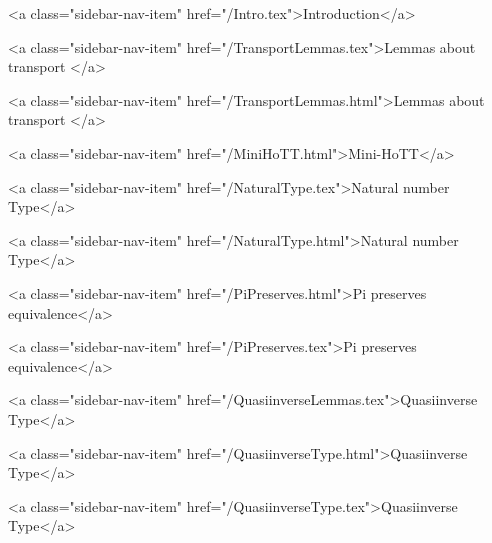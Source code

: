       
    
      
        
          <a class="sidebar-nav-item" href="/Intro.tex">Introduction</a>
        
      
    
      
        
          <a class="sidebar-nav-item" href="/TransportLemmas.tex">Lemmas about transport </a>
        
      
    
      
        
          <a class="sidebar-nav-item" href="/TransportLemmas.html">Lemmas about transport </a>
        
      
    
      
        
          <a class="sidebar-nav-item" href="/MiniHoTT.html">Mini-HoTT</a>
        
      
    
      
        
          <a class="sidebar-nav-item" href="/NaturalType.tex">Natural number Type</a>
        
      
    
      
        
          <a class="sidebar-nav-item" href="/NaturalType.html">Natural number Type</a>
        
      
    
      
        
          <a class="sidebar-nav-item" href="/PiPreserves.html">Pi preserves equivalence</a>
        
      
    
      
        
          <a class="sidebar-nav-item" href="/PiPreserves.tex">Pi preserves equivalence</a>
        
      
    
      
        
          <a class="sidebar-nav-item" href="/QuasiinverseLemmas.tex">Quasiinverse Type</a>
        
      
    
      
        
          <a class="sidebar-nav-item" href="/QuasiinverseType.html">Quasiinverse Type</a>
        
      
    
      
        
          <a class="sidebar-nav-item" href="/QuasiinverseType.tex">Quasiinverse Type</a>
        
